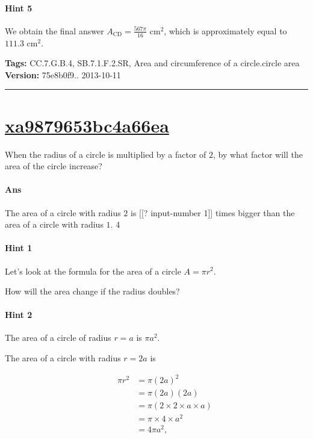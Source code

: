 \documentclass[twocolumn,10pt]{article}
\begin{document}
\paragraph{Hint 5}We obtain the final answer $A_{\text{CD}}=\frac{567\pi}{16}\text{ cm}^2$, which is approximately equal to $111.3\text{ cm}^2$.



\medskip
\noindent
\textbf{Tags:} {\footnotesize CC.7.G.B.4, SB.7.1.F.2.SR, Area and circumference of a circle.circle area}\\
\textbf{Version:} 75e8b0f9.. 2013-10-11
\smallskip\hrule





\section{\href{https://www.khanacademy.org/devadmin/content/items/xa9879653bc4a66ea}{xa9879653bc4a66ea}}

\noindent
When the radius of a circle is multiplied by a factor of $2$, by what factor will the area of the circle increase?

\paragraph{Ans} The area of a circle with radius $2$ is [[? input-number 1]] times bigger than the area of a circle with radius $1$.  4

\paragraph{Hint 1}Let's look at the formula for the area of a circle $A=\pi r^2$. 

How will the area change if the radius doubles?

\paragraph{Hint 2}The area of a circle of radius $r=a$ is $\pi a^2$.

The area of a circle with radius $r=2a$ is 

\begin{align*}
\qquad  \pi r^2 & =\pi (2a)^2  \\
  & =\pi(2a)(2a) \\
  &=\pi(2 \times 2 \times a \times a)  \\
   &= \pi \times 4 \times a^2 \\
   &= 4\pi a^2,
\end{align*} 
\end{document}
